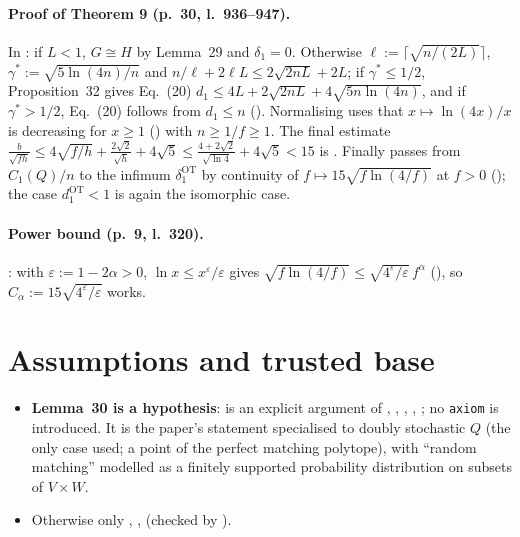 \paragraph{Proof of Theorem 9 (p.~30, l.~936--947).} In : if $L<1$, $G\cong H$
by Lemma~29 and $\delta_1=0$. Otherwise $\ell:=\lceil\sqrt{n/(2L)}\rceil$, $\gamma^*:=\sqrt{5\ln(4n)/n}$ and
$n/\ell+2\ell L\le2\sqrt{2nL}+2L$; if $\gamma^*\le1/2$, Proposition~32 gives Eq.~(20)
$d_1\le4L+2\sqrt{2nL}+4\sqrt{5n\ln(4n)}$, and if $\gamma^*>1/2$, Eq.~(20) follows from $d_1\le n$
(). Normalising uses that $x\mapsto\ln(4x)/x$ is decreasing for $x\ge1$
() with $n\ge1/f\ge1$. The final estimate
$\frac{b}{\sqrt{fh}}\le4\sqrt{f/h}+\frac{2\sqrt2}{\sqrt h}+4\sqrt5\le\frac{4+2\sqrt2}{\sqrt{\ln4}}+4\sqrt5<15$
is . Finally  passes from $C_1(Q)/n$ to the infimum
$\delta_1^{\mathrm{OT}}$ by continuity of $f\mapsto15\sqrt{f\ln(4/f)}$ at $f>0$ ();
the case $d_1^{\mathrm{OT}}<1$ is again the isomorphic case.

\paragraph{Power bound (p.~9, l.~320).} : with $\varepsilon:=1-2\alpha>0$,
$\ln x\le x^\varepsilon/\varepsilon$ gives $\sqrt{f\ln(4/f)}\le\sqrt{4^\varepsilon/\varepsilon}\,f^\alpha$
(), so $C_\alpha:=15\sqrt{4^\varepsilon/\varepsilon}$ works.

\section{Assumptions and trusted base}
\begin{itemize}
\item \textbf{Lemma~30 is a hypothesis}:  is an explicit argument
   of , , , ,
  ; no \texttt{axiom} is introduced. It is the paper's statement specialised to doubly stochastic
  $Q$ (the only case used; a point of the perfect matching polytope), with ``random matching'' modelled as a
  finitely supported probability distribution on subsets of $V\times W$.
\item Otherwise only , ,  (checked by
  ).
\end{itemize}

